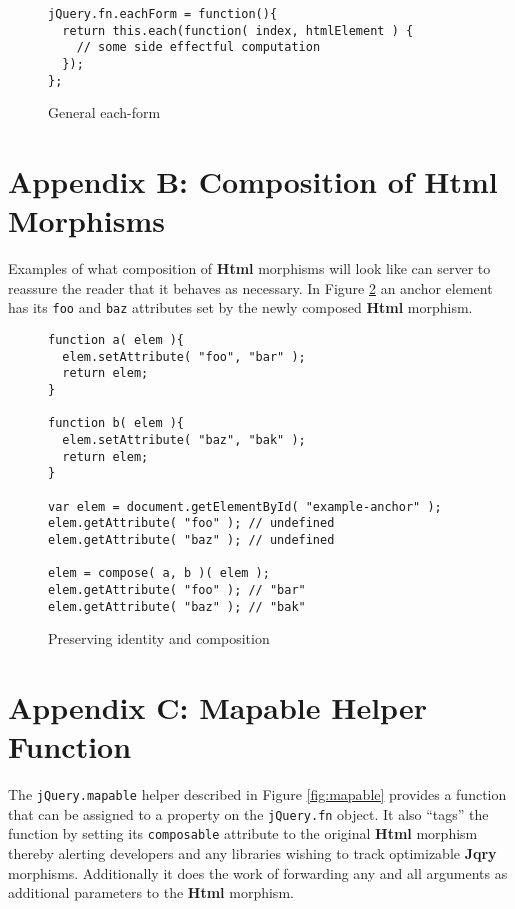 \documentclass[preprint]{sigplanconf}
\begin{document}
\begin{figure}[!ht]
\small
\begin{verbatim}
jQuery.fn.eachForm = function(){
  return this.each(function( index, htmlElement ) {
    // some side effectful computation
  });
};
\end{verbatim}
\nocaptionrule \caption{General each-form}
\label{fig:each-form}
\end{figure}

\section{Appendix B: Composition of Html Morphisms}

Examples of what composition of \textbf{Html} morphisms will look like can server to reassure the reader that it behaves as necessary. In Figure \ref{fig:html-compose} an anchor element has its \verb|foo| and \verb|baz| attributes set by the newly composed \textbf{Html} morphism.

\begin{figure}[!ht]
\small
\begin{verbatim}
function a( elem ){
  elem.setAttribute( "foo", "bar" );
  return elem;
}

function b( elem ){
  elem.setAttribute( "baz", "bak" );
  return elem;
}

var elem = document.getElementById( "example-anchor" );
elem.getAttribute( "foo" ); // undefined
elem.getAttribute( "baz" ); // undefined

elem = compose( a, b )( elem );
elem.getAttribute( "foo" ); // "bar"
elem.getAttribute( "baz" ); // "bak"
\end{verbatim}
\nocaptionrule \caption{Preserving identity and composition}
\label{fig:html-compose}
\end{figure}

\section{Appendix C: Mapable Helper Function}

The \verb|jQuery.mapable| helper described in Figure \ref{fig:mapable} provides a function that can be assigned to a property on the \verb|jQuery.fn| object. It also ``tags'' the function by setting its \verb|composable| attribute to the original \textbf{Html} morphism thereby alerting developers and any libraries wishing to track optimizable \textbf{Jqry} morphisms. Additionally it does the work of forwarding any and all arguments as additional parameters to the \textbf{Html} morphism.
\end{document}
